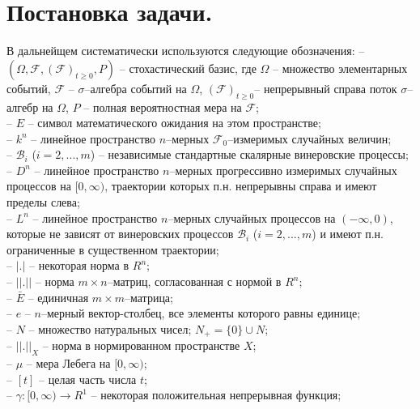 
\section{Постановка задачи.}\label{kri-s1}
В дальнейщем систематически
используются следующие обозначения:
  -- $(\Omega , {\mathcal F}, ({\mathcal F})_{t\ge0},P)$
-- стохастический базис, где $ \Omega $ -- множество элементарных
событий, ${\mathcal F}$ -- $\sigma$--алгебра событий на $\Omega$,
$({\mathcal F})_{t\ge0}$-- непрерывный справа поток $\sigma$--алгебр
на $\Omega$, $P$ -- полная вероятностная мера на $\mathcal{F}$;
\\ -- $E$ --
символ математического ожидания на этом пространстве;\\
-- $k^n$ -- линейное пространство  $n$--мерных
${\mathcal F}_0$--измеримых случайных величин;\\
  --  $\mathcal B_i$ ($i=2,...,m$)
-- независимые стандартные скалярные винеровские процессы;\\
-- $D^n$ -- линейное пространство $n$--мерных прогрессивно измеримых
случайных процессов на $[0, \infty )$, траектории которых п.н.
непрерывны справа и имеют пределы слева;\\
-- $L^n$ -- линейное пространство $n$--мерных случайных
процессов на $(-\infty , 0)$, которые не зависят от винеровских процессов
$\mathcal B_i$ ($i=2,...,m$) и имеют п.н. ограниченные в
существенном траектории;\\
-- $|.|$ -- некоторая норма в $R^n$;\\
 -- $||.||$ -- норма $m\times n$--матриц, согласованная с нормой в
$R^n$;\\
 -- $\bar E$ -- единичная $m \times m$--матрица;\\
 -- $e$ --
$n$--мерный вектор-столбец, все элементы которого равны единице;\\
  -- $N$ --
множество натуральных чисел; $N_+ = \{0\}\cup N$;\\
-- $||.||_X$ -- норма в нормированном
пространстве $X$;\\
-- $\mu $ -- мера Лебега на $[0, \infty)$;\\
-- $[t]$
-- целая часть числа $t$; \\
--  $\gamma :[0, \infty) \rightarrow R^1 $ -- некоторая
положительная непрерывная функция;\\
